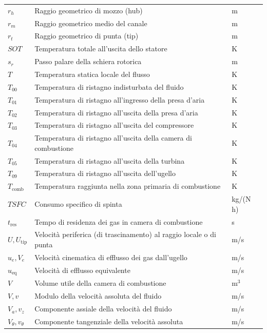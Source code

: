 \begin{longtable}{p{} p{} p{}}
    $r_h$ & Raggio geometrico di mozzo (hub) & m \\[2px]
    $r_m$ & Raggio geometrico medio del canale & m \\[2px]
    $r_t$ & Raggio geometrico di punta (tip) & m \\[2px]
    $SOT$ & Temperatura totale all'uscita dello statore & K \\[2px]
    $s_r$ & Passo palare della schiera rotorica & m \\[2px]
    $T$ & Temperatura statica locale del flusso & K \\[2px]
    $T_{00}$ & Temperatura di ristagno indisturbata del fluido & K \\[2px]
    $T_{01}$ & Temperatura di ristagno all'ingresso della presa d'aria & K \\[2px]
    $T_{02}$ & Temperatura di ristagno all'uscita della presa d'aria & K \\[2px]
    $T_{03}$ & Temperatura di ristagno all'uscita del compressore & K \\[2px]
    $T_{04}$ & Temperatura di ristagno all'uscita della camera di combustione & K \\[2px]
    $T_{05}$ & Temperatura di ristagno all'uscita della turbina & K \\[2px]
    $T_{09}$ & Temperatura di ristagno all'uscita dell'ugello & K \\[2px]
    $T_{\text{comb}}$ & Temperatura raggiunta nella zona primaria di combustione & K \\[2px]
    $TSFC$ & Consumo specifico di spinta & kg/(N h) \\[2px]
    $t_{\text{res}}$ & Tempo di residenza dei gas in camera di combustione & s \\[2px]
    $U, U_{\text{tip}}$ & Velocità periferica (di trascinamento) al raggio locale o di punta & m/s \\[2px]
    $u_e, V_e$ & Velocità cinematica di efflusso dei gas dall'ugello & m/s \\[2px]
    $u_{\text{eq}}$ & Velocità di efflusso equivalente & m/s \\[2px]
    $V$ & Volume utile della camera di combustione & $\text{m}^3$ \\[2px]
    $V, v$ & Modulo della velocità assoluta del fluido & m/s \\[2px]
    $V_a, v_z$ & Componente assiale della velocità del fluido & m/s \\[2px]
    $V_\theta, v_\theta$ & Componente tangenziale della velocità assoluta & m/s \\[2px]

\end{longtable}
